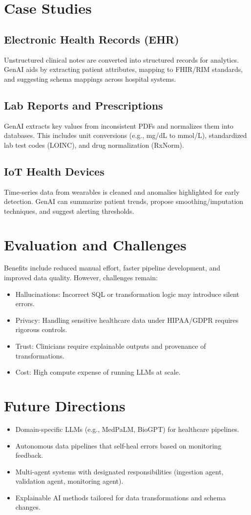 \documentclass[conference]{IEEEtran}
\begin{document}
\section{Case Studies}
\subsection{Electronic Health Records (EHR)}
Unstructured clinical notes are converted into structured records for analytics. GenAI aids by extracting patient attributes, mapping to FHIR/RIM standards, and suggesting schema mappings across hospital systems.

\subsection{Lab Reports and Prescriptions}
GenAI extracts key values from inconsistent PDFs and normalizes them into databases. This includes unit conversions (e.g., mg/dL to mmol/L), standardized lab test codes (LOINC), and drug normalization (RxNorm).

\subsection{IoT Health Devices}
Time-series data from wearables is cleaned and anomalies highlighted for early detection. GenAI can summarize patient trends, propose smoothing/imputation techniques, and suggest alerting thresholds.

\section{Evaluation and Challenges}
Benefits include reduced manual effort, faster pipeline development, and improved data quality. However, challenges remain:
\begin{itemize}
    \item Hallucinations: Incorrect SQL or transformation logic may introduce silent errors.
    \item Privacy: Handling sensitive healthcare data under HIPAA/GDPR requires rigorous controls.
    \item Trust: Clinicians require explainable outputs and provenance of transformations.
    \item Cost: High compute expense of running LLMs at scale.
\end{itemize}

\section{Future Directions}
\begin{itemize}
    \item Domain-specific LLMs (e.g., MedPaLM, BioGPT) for healthcare pipelines.
    \item Autonomous data pipelines that self-heal errors based on monitoring feedback.
    \item Multi-agent systems with designated responsibilities (ingestion agent, validation agent, monitoring agent).
    \item Explainable AI methods tailored for data transformations and schema changes.
\end{itemize}
\end{document}
